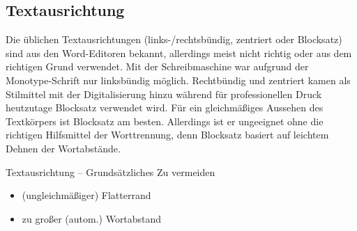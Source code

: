   
\subsection{Textausrichtung}
Die üblichen Textausrichtungen (links-/rechtsbündig,
zentriert oder Blocksatz) sind aus den Word-Editoren bekannt,
allerdings meist nicht richtig oder aus dem richtigen Grund
verwendet. Mit der Schreibmaschine war aufgrund der Monotype-Schrift
nur linksbündig möglich. Rechtbündig und zentriert kamen als
Stilmittel mit der Digitalisierung hinzu während für professionellen
Druck heutzutage Blocksatz verwendet wird. Für ein gleichmäßiges
Aussehen des Textkörpers ist Blocksatz am besten. Allerdings ist er
ungeeignet ohne die richtigen Hilfsmittel der Worttrennung, denn
Blocksatz basiert auf leichtem Dehnen der Wortabstände.

\begin{frame}{Textausrichtung – Grundsätzliches}
  Zu vermeiden
  \begin{itemize}
  \item (ungleichmäßiger) Flatterrand
  \item zu großer (autom.) Wortabstand
  \end{itemize}
\end{frame}

